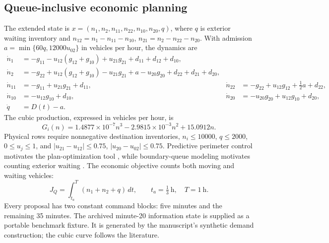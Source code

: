 \subsection{Queue-inclusive economic planning}
The extended state is $x=(n_1,n_2,n_{11},n_{22},n_{10},n_{20},q)$, where $q$
is exterior waiting inventory and $n_{12}=n_1-n_{11}-n_{10}$,
$n_{21}=n_2-n_{22}-n_{20}$. With admission
$a=\min\{60q,12000u_{02}\}$ in vehicles per hour, the dynamics are
\begin{align}
 \dot n_1&=-g_{11}-u_{12}(g_{12}+g_{10})+u_{21}g_{21}
                    +d_{11}+d_{12}+d_{10},\\
 \dot n_2&=-g_{22}+u_{12}(g_{12}+g_{10})-u_{21}g_{21}
                    +a-u_{20}g_{20}+d_{22}+d_{21}+d_{20},\\
 \dot n_{11}&=-g_{11}+u_{21}g_{21}+d_{11},&
 \dot n_{22}&=-g_{22}+u_{12}g_{12}+\tfrac12a+d_{22},\\
 \dot n_{10}&=-u_{12}g_{10}+d_{10},&
 \dot n_{20}&=-u_{20}g_{20}+u_{12}g_{10}+d_{20},\\
 \dot q&=D(t)-a.
\end{align}
The cubic production, expressed in vehicles per hour, is
\begin{equation}
 G_i(n)=1.4877\times10^{-7}n^3-2.9815\times10^{-3}n^2+15.0912n.
\end{equation}
Physical rows require nonnegative destination inventories, $n_i\le10000$,
$q\le2000$, $0\le u_j\le1$, and
$|u_{21}-u_{12}|\le0.75$, $|u_{20}-u_{02}|\le0.75$.
Predictive perimeter control motivates the plan-optimization tool
\cite{geroliminis2013mpc}, while boundary-queue modeling motivates counting
exterior waiting \cite{haddad2017queues}. The economic objective counts both
moving and waiting vehicles:
\begin{equation}
 J_Q=\int_{t_a}^{T}(n_1+n_2+q)\,dt,
 \qquad t_a=\tfrac13\ \mathrm{h},\quad T=1\ \mathrm{h}.
\end{equation}
Every proposal has two constant command blocks: five minutes and the
remaining 35 minutes. The archived minute-20 information state is supplied
as a portable benchmark fixture. It is generated by the manuscript's
synthetic demand construction; the cubic curve follows the literature.

